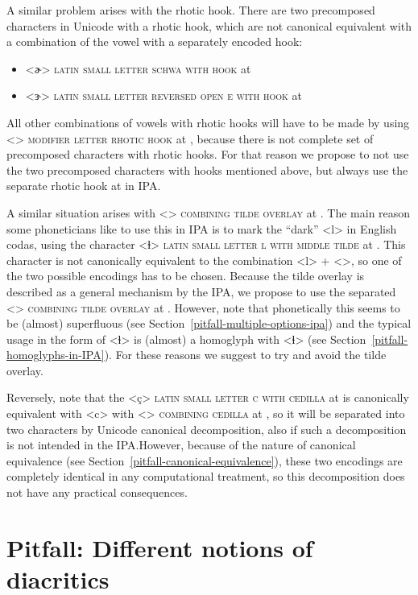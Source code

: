 A similar problem arises with the rhotic hook. There are two precomposed
characters in Unicode with a rhotic hook, which are not canonical equivalent 
with a combination of the vowel with a separately encoded hook:
\begin{itemize}
  \item[] <ɚ> \textsc{latin small letter schwa with hook} at 
  \item[] <ɝ> \textsc{latin small letter reversed open e with hook} at 
\end{itemize}
All other combinations of vowels with rhotic hooks will have to be made by using
<> \textsc{modifier letter rhotic hook} at , because there
is not complete set of precomposed characters with rhotic hooks. For that reason
we propose to not use the two precomposed characters with hooks mentioned above,
but always use the separate rhotic hook at  in IPA.\@

A similar situation arises with <> \textsc{combining tilde overlay} at
. The main reason some phoneticians like to use this in IPA is to mark
the ``dark'' <l> in English codas, using the character <ɫ> \textsc{latin small
letter l with middle tilde} at . This character is not canonically
equivalent to the combination <l> + <>, so one of the two possible
encodings has to be chosen. Because the tilde overlay is described as a general
mechanism by the IPA, we propose to use the separated <>
\textsc{combining tilde overlay} at . However, note that phonetically 
this seems to be (almost) superfluous (see Section~\ref{pitfall-multiple-options-ipa}) 
and the typical usage in the form of <ɫ> is (almost) a homoglyph with <ɬ> (see 
Section~\ref{pitfall-homoglyphs-in-IPA}). For these reasons we suggest to try 
and avoid the tilde overlay.

Reversely, note that the <ç> \textsc{latin small letter c with cedilla} at
 is canonically equivalent with <c> with <>
\textsc{combining cedilla} at , so it will be separated into two
characters by Unicode canonical decomposition, also if such a decomposition is
not intended in the IPA.\@ However, because of the nature of canonical
equivalence (see Section~\ref{pitfall-canonical-equivalence}), these two
encodings are completely identical in any computational treatment, so this
decomposition does not have any practical consequences.

\section{Pitfall: Different notions of diacritics}
\label{pitfall-different-notions-of-diacritics}


